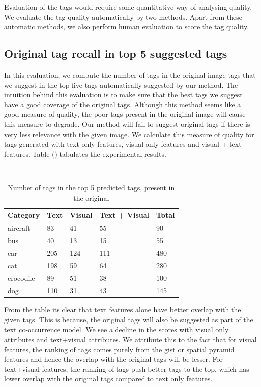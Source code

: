 \documentclass[12pt]{article}
\begin{document}
Evaluation of the tags would require some quantitative way of analysing quality. We evaluate
the tag quality automatically by two methods. Apart from these automatic methods, we also
perform human evaluation to score the tag quality.

\subsection{Original tag recall in top 5 suggested tags}
In this evaluation, we compute the number of tags in the original image tags that we suggest
in the top five tags automatically suggested by our method. The intuition behind this evaluation
is to make sure that the best tags we suggest have a good coverage of the original tags. Although
this method seems like a good measure of quality, the poor tags present in the original image
will cause this measure to degrade. Our method will fail to suggest original tags if there is
very less relevance with the given image. We calculate this measure of quality for tags generated
with text only features, visual only features and visual + text features. Table () tabulates the
experimental results.


\begin{table}
  \caption{Number of tags in the top 5 predicted tags, present in
  the original}
  \begin{center}
    \begin{tabular}{|l l l l l|}
\hline
Category & Text & Visual & Text + Visual & Total \\
\hline
aircraft & 83 & 41 & 55 & 90 \\
bus & 40 & 13 & 15 & 55 \\
car & 205 & 124 & 111 & 480 \\
cat & 198 & 59 & 64 & 280 \\
crocodile & 89 & 51 & 38 & 100 \\
dog & 110 & 31 & 43 & 145 \\
\hline
\end{tabular}
\end{center}
\end{table}

From the table its clear that text features alone have better overlap with the given tags.
This is because, the original tags will also be suggested as part of the text co-occurrence
model. We see a decline in the scores with visual only attributes and text+visual attributes.
We attribute this to the fact that for visual features, the ranking of tags comes purely from
the gist or spatial pyramid features and hence the overlap with the original tags will be lesser.
For text+visual features, the ranking of tags push better tags to the top, which has lower overlap
with the original tags compared to text only features.
\end{document}
